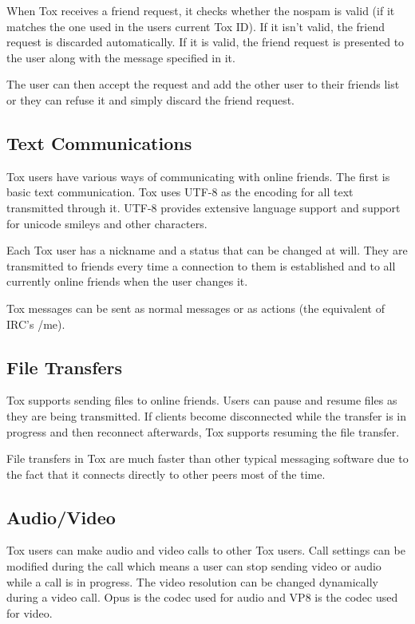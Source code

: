 \documentclass{tox}
\begin{document}
When Tox receives a friend request, it checks whether the nospam is valid (if 
it matches the one used in the users current Tox ID). If it isn't valid, the friend 
request is discarded automatically. If it is valid, the friend request is presented to the 
user along with the message specified in it.

The user can then accept the request and add the other user to their friends list 
or they can refuse it and simply discard the friend request.

\subsection{Text Communications}

Tox users have various ways of communicating with online friends. The first is 
basic text communication. Tox uses UTF-8 as the encoding for all text 
transmitted through it. UTF-8 provides extensive language support and support for 
unicode smileys and other characters.

Each Tox user has a nickname and a status that can be changed at will. They are 
transmitted to friends every time a connection to them is established and to 
all currently online friends when the user changes it.

Tox messages can be sent as normal messages or as actions (the equivalent of 
IRC's /me).

\subsection{File Transfers}

Tox supports sending files to online friends. Users can pause and resume files 
as they are being transmitted. If clients become disconnected while the transfer is 
in progress and then reconnect afterwards, Tox supports resuming the file transfer.

File transfers in Tox are much faster than other typical messaging software due 
to the fact that it connects directly to other peers most of the time.

\subsection{Audio/Video}

Tox users can make audio and video calls to other Tox users. Call settings can 
be modified during the call which means a user can stop sending video or audio 
while a call is in progress. The video resolution can be changed dynamically 
during a video call. Opus is the codec used for audio and VP8 is the codec used 
for video.
\end{document}
